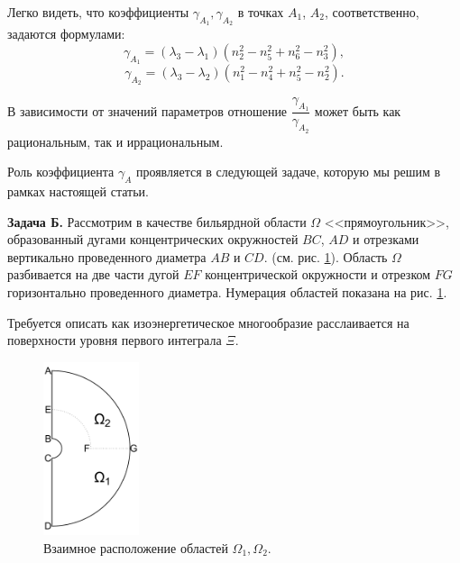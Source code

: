 Легко видеть, что коэффициенты $\gamma_{A_1}, \gamma_{A_2}$ в точках $A_1$, $A_2$, соответственно, задаются формулами:
$$\gamma_{A_1} = (\lambda_3 - \lambda_1)(n_2^2 - n_5^2 + n_6^2 - n_3^2),$$
$$\gamma_{A_2} = (\lambda_3 - \lambda_2)(n_1^2 - n_4^2 + n_5^2 - n_2^2).$$

В зависимости от значений параметров отношение $\dfrac{\gamma_{A_1}}{\gamma_{A_2}}$ может быть как рациональным, так и иррациональным.

Роль коэффициента $\gamma_A$ проявляется в следующей задаче, которую мы решим в рамках настоящей статьи.

\textbf{Задача Б.} Рассмотрим в качестве бильярдной области $\Omega$  <<прямоугольник>>, образованный дугами концентрических окружностей $BC$, $AD$ и отрезками вертикально проведенного диаметра $AB$ и $CD$. (см. рис. \ref{fig:pt8:_example9}).
Область $\Omega$ разбивается на две части дугой  $EF$ концентрической окружности  и отрезком $FG$ горизонтально проведенного диаметра. Нумерация областей показана на рис. \ref{fig:pt8:_example9}.

Требуется описать как изоэнергетическое многообразие расслаивается на поверхности уровня первого интеграла $\Xi$.


\begin{figure}[!htb]
\centering
   \includegraphics[width=0.25\textwidth]{images/ch4/section1/imgB.pdf}   
    \caption{Взаимное расположение областей $\Omega_1, \Omega_2$.}
    \label{fig:pt8:_example9}
\end{figure}


\clearpage
